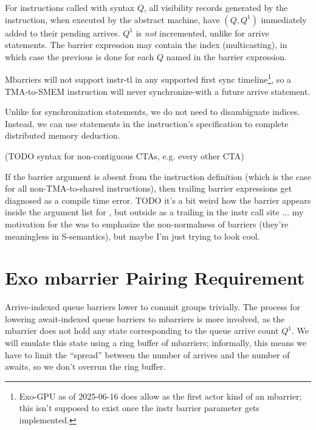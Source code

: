 \filbreak
{}

For instructions called with syntax  $Q$, all visibility records generated by the instruction, when executed by the abstract machine, have $(Q, Q^1)$ immediately added to their pending arrives.
$Q^1$ is \textit{not} incremented, unlike for arrive statements.
The barrier expression may contain the \lighttt{:} index (multicasting), in which case the previous is done for each $Q$ named in the barrier expression.

\filbreak
Mbarriers will not support  instr-tl in any supported first sync timeline\footnote{Exo-GPU as of 2025-06-16 does allow  as the first actor kind of an mbarrier; this isn't supposed to exist once the instr barrier parameter gets implemented.}, so a TMA-to-SMEM instruction will never synchronize-with a future arrive statement.

\filbreak
{}

Unlike for synchronization statements, we do not need to disambiguate \lighttt{:} indices.
Instead, we can use  statements in the instruction's  specification to complete distributed memory deduction.



(TODO syntax for non-contiguous CTAs, e.g. every other CTA)

\filbreak
If the barrier argument is absent from the instruction definition (which is the case for all non-TMA-to-shared instructions), then trailing barrier expressions get diagnosed as a compile time error.
TODO it's a bit weird how the barrier appears inside the argument list for , but outside as a trailing  in the instr call site ... my motivation for the \lighttt{>>} was to emphasize the non-normalness of barriers (they're meaningless in S-semantics), but maybe I'm just trying to look cool.

\newpage
\section{Exo mbarrier Pairing Requirement}
\label{ch:mbarrier}

Arrive-indexed queue barriers lower to commit groups trivially.
The process for lowering await-indexed queue barriers to mbarriers is more involved, as the mbarrier does not hold any state corresponding to the queue arrive count $Q^1$.
We will emulate this state using a ring buffer of mbarriers; informally, this means we have to limit the ``spread'' between the number of arrives and the number of awaits, so we don't overrun the ring buffer.

